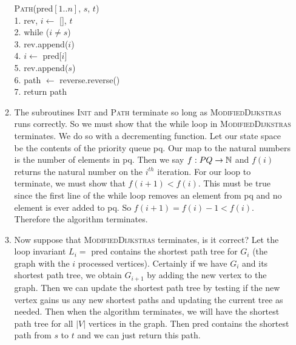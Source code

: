 \documentclass{article}
\begin{document}
\begin{enumerate}[label=(\alph*)]
\begin{enumerate}[label=\alph*)]
\begin{algorithm}
                \textsc{Path}(pred$[1..n]$, $s$, $t$) \\
                1. \hspace{1em} rev, $i \gets$ [], $t$ \\
                2. \hspace{1em} while ($i \neq s$) \\
                3. \hspace{2em}     rev.append($i$) \\
                4. \hspace{2em}     $i \gets $ pred[$i$] \\
                5. \hspace{1em} rev.append($s$) \\
                6. \hspace{1em} path $\gets$ reverse.reverse() \\
                7. \hspace{1em} return path
            \end{algorithm}
            \item The subroutines \textsc{Init} and \textsc{Path} terminate so long as \textsc{ModifiedDijkstras} runs correctly.
            So we must show that the while loop in \textsc{ModifiedDijkstras} terminates.
            We do so with a decrementing function.
            Let our state space be the contents of the priority queue pq.
            Our map to the natural numbers is the number of elements in pq.
            Then we say $f: PQ \rightarrow {\mathbb N}$ and $f(i)$ returns the natural number on the $i^{th}$ iteration.
            For our loop to terminate, we must show that $f(i+1) < f(i)$.
            This must be true since the first line of the while loop removes an element from pq and no element is ever added to pq.
            So $f(i+1) = f(i) - 1 < f(i)$.
            Therefore the algorithm terminates.
            \item Now suppose that \textsc{ModifiedDijkstras} terminates, is it correct?
            Let the loop invariant $L_i = $ pred contains the shortest path tree for $G_i$ (the graph with the $i$ processed vertices).
            Certainly if we have $G_i$ and its shortest path tree, we obtain $G_{i+1}$ by adding the new vertex to the graph.
            Then we can update the shortest path tree by testing if the new vertex gains us any new shortest paths and updating the current tree as needed.
            Then when the algorithm terminates, we will have the shortest path tree for all $|V|$ vertices in the graph.
            Then pred contains the shortest path from $s$ to $t$ and we can just return this path.
        \end{enumerate}
\end{enumerate}
\end{document}
